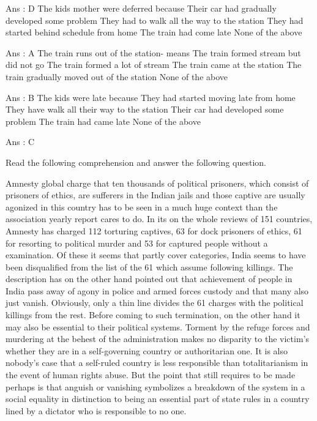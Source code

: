         Ans : D
        The kids mother were deferred because
            Their car had gradually developed some problem
            They had to walk all the way to the station
            They had started behind schedule from home
            The train had come late
            None of the above 

        Ans : A
        The train runs out of the station- means
            The train formed stream but did not go
            The train formed a lot of stream
            The train came at the station
            The train gradually moved out of the station
            None of the above 

        Ans : B
        The kids were late because
            They had started moving late from home
            They have walk all their way to the station
            Their car had developed some problem
            The train had came late
            None of the above 

        Ans : C 




Read the following comprehension and answer the following question.

    Amnesty global charge that ten thousands of political prisoners, which consist of prisoners of ethics, are sufferers in the Indian jails and those captive are usually agonized in this country has to be seen in a much huge context than the association yearly report cares to do. In its on the whole reviews of 151 countries, Amnesty has charged 112 torturing captives, 63 for dock prisoners of ethics, 61 for resorting to political murder and 53 for captured people without a examination. Of these it seems that partly cover categories, India seems to have been disqualified from the list of the 61 which assume following killings. The description has on the other hand pointed out that achievement of people in India pass away of agony in police and armed forces custody and that many also just vanish. Obviously, only a thin line divides the 61 charges with the political killings from the rest. Before coming to such termination, on the other hand it may also be essential to their political systems. Torment by the refuge forces and murdering at the behest of the administration makes no disparity to the victim’s whether they are in a self-governing country or authoritarian one. It is also nobody’s case that a self-ruled country is less responsible than totalitarianism in the event of human rights abuse. But the point that still requires to be made perhaps is that anguish or vanishing symbolizes a breakdown of the system in a social equality in distinction to being an essential part of state rules in a country lined by a dictator who is responsible to no one.

